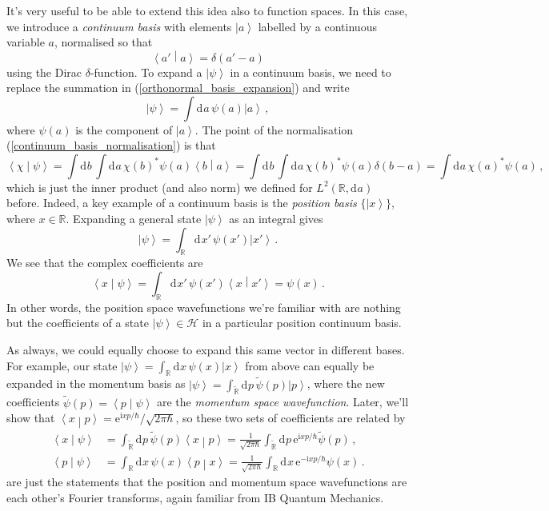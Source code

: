 \documentclass{article}
\theoremstyle{plain}\theoremheaderfont{\normalfont\itshape}\theorembodyfont{\rmfamily}\theoremseparator{.}\newtheorem*{rem}{Remark}\newtheorem*{ex}{Example}\newtheorem*{proof}{Proof}\newtheorem*{altp}{Alternative proof}
\theoremstyle{plain}\theoremheaderfont{\normalfont\bfseries}\theorembodyfont{\rmfamily}\theoremseparator{.}\newtheorem{thm}{Theorem}[section]\newtheorem{lem}[thm]{Lemma}\newtheorem{prop}[thm]{Proposition}\newtheorem*{cor}{Corollary}\newtheorem{defn}[thm]{Definition}\newtheorem{clm}[thm]{Claim}\newtheorem{clminproof}{Claim}
\theoremstyle{break}\theoremheaderfont{\normalfont\itshape}\theorembodyfont{\rmfamily}\theoremseparator{.\medskip}\newtheorem*{proofskip}{Proof}\newtheorem*{exs}{Examples}\newtheorem*{rems}{Remarks}
\theoremstyle{break}\theoremheaderfont{\normalfont\bfseries}\theorembodyfont{\rmfamily}\theoremseparator{.\medskip}\newtheorem{lemskip}[thm]{Lemma}\newtheorem{defnskip}[thm]{Definition}\newtheorem{propskip}[thm]{Proposition}\newtheorem{thmskip}[thm]{Theorem}
\numberwithin{equation}{section}
\newcommand{\ii}{\mathrm{i}}
\newcommand{\ee}{\mathrm{e}}
\newcommand{\dd}[2][]{\mathrm{d}^{#1} #2\,}
\renewcommand{\d}[2][]{\mathrm{d}^{#1} #2}
\newcommand{\ket}[1]{\left| #1 \right\rangle}
\newcommand{\braket}[2]{\left\langle #1 \middle| #2 \right\rangle}
\newcommand{\hb}{\mathcal{H}}
\newcommand{\RR}{\mathbb{R}}
\begin{document}
    It's very useful to be able to extend this idea also to function spaces. In this case, we introduce a \textit{continuum basis} with elements \(\ket{a}\) labelled by a continuous variable \(a\), normalised so that
    \begin{equation}\label{continuum_basis_normalisation}
        \braket{a'}{a}=\delta(a'-a)
    \end{equation}
    using the Dirac \(\delta\)-function. To expand a \(\ket{\psi}\) in a continuum basis, we need to replace the summation in (\ref{orthonormal_basis_expansion}) and write
    \begin{equation}
        \ket{\psi}=\int\dd{a}\psi(a)\ket{a}\,,
    \end{equation}
    where \(\psi(a)\) is the component of \(\ket{a}\). The point of the normalisation (\ref{continuum_basis_normalisation}) is that
    \begin{equation}
        \braket{\chi}{\psi}=\int\dd{b}\int\dd{a}\chi(b)^*\psi(a)\braket{b}{a}=\int\dd{b}\int\dd{a}\chi(b)^*\psi(a)\delta(b-a)=\int\dd{a}\chi(a)^*\psi(a)\,,
    \end{equation}
    which is just the inner product (and also norm) we defined for \(L^2(\RR,\d{a})\) before. Indeed, a key example of a continuum basis is the \textit{position basis} \(\{\ket{x}\}\), where \(x\in\RR\). Expanding a general state \(\ket{\psi}\) as an integral gives
    \begin{equation}
        \ket{\psi}=\int_\RR\dd{x'}\psi(x')\ket{x'}\,.
    \end{equation}
    We see that the complex coefficients are
    \begin{equation}
        \braket{x}{\psi}=\int_\RR\dd{x'}\psi(x')\braket{x}{x'}=\psi(x)\,.
    \end{equation}
    In other words, the position space wavefunctions we're familiar with are nothing but the coefficients of a state \(\ket{\psi}\in\hb\) in a particular position continuum basis.

    As always, we could equally choose to expand this same vector in different bases. For example, our state \(\ket{\psi}=\int_\RR\dd{x}\psi(x)\ket{x}\) from above can equally be expanded in the momentum basis as \(\ket{\psi}=\int_{\tilde{\RR}} \dd{p}\tilde{\psi}(p)\ket{p}\), where the new coefficients \(\tilde{\psi}(p)=\braket{p}{\psi}\) are the \textit{momentum space wavefunction}. Later, we'll show that \(\braket{x}{p}=\ee^{\ii xp/\hbar}/\sqrt{2\pi\hbar}\), so these two sets of coefficients are related by
    \begin{align}\label{xp_coefficient_relation}
        \braket{x}{\psi}&=\int_{\tilde{\RR}}\dd{p}\tilde{\psi}(p)\braket{x}{p}=\frac{1}{\sqrt{2\pi\hbar}}\int_{\tilde{\RR}}\dd{p}\ee^{\ii xp/\hbar}\tilde{\psi}(p)\,,\\
        \braket{p}{\psi}&=\int_{\RR}\dd{x}\psi(x)\braket{p}{x}=\frac{1}{\sqrt{2\pi\hbar}}\int_{\RR}\dd{x}\ee^{-\ii xp/\hbar}\psi(x)\,.\label{px_coefficient_relation}
    \end{align}
     are just the statements that the position and momentum space wavefunctions are each other's Fourier transforms, again familiar from IB Quantum Mechanics.
\end{document}
